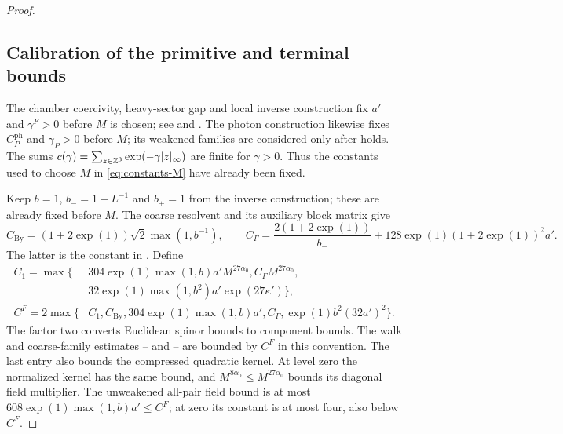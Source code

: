 \begin{proof}
\subsection{Calibration of the primitive and terminal bounds}

The chamber coercivity, heavy-sector gap and local inverse
construction fix $a'$ and $\gamma^F>0$ before $M$ is chosen;
see  and
. The photon construction
likewise fixes $C_P^{\mathrm{ph}}$ and $\gamma_P>0$ before $M$;
its weakened families are considered only after
 holds.
The sums $c(\gamma)=\sum_{z\in\mathbb Z^3}
\exp(-\gamma|z|_\infty)$ are finite for $\gamma>0$.
Thus the constants used to choose $M$ in
\eqref{eq:constants-M} have already been fixed.

Keep $b=1$, $b_-=1-L^{-1}$ and $b_+=1$ from the inverse
construction; these are already fixed before $M$.
The coarse resolvent and its auxiliary block matrix give
\[
 C_{\mathrm{By}}=(1+2\exp(1))\sqrt2\max(1,b_-^{-1}),
 \qquad
 C_\Gamma=\frac{2(1+2\exp(1))}{b_-}
                  +128\exp(1)(1+2\exp(1))^2a'.
\]
The latter is the constant in
. Define
\begin{equation}\label{eq:constants-fermion-calibration}
 \begin{split}
 C_1=\max\{&
 304\exp(1)\max(1,b)a'M^{27\alpha_0},
 C_\Gamma M^{27\alpha_0},\\
 &32\exp(1)\max(1,b^2)a'\exp(27\kappa')\},\\
 C^F=2\max\{&
 C_1,C_{\mathrm{By}},304\exp(1)\max(1,b)a',
 C_\Gamma,\exp(1)b^2(32a')^2\}.
 \end{split}
\end{equation}
The factor two converts Euclidean spinor bounds to
component bounds. The walk and coarse-family estimates
--
and --
are bounded by $C^F$ in this convention. The last entry
also bounds the compressed quadratic kernel.
At level zero the normalized kernel has the same bound,
and $M^{8\alpha_0}\le M^{27\alpha_0}$ bounds its diagonal
field multiplier.
The unweakened all-pair field bound
 is at most
$608\exp(1)\max(1,b)a'\le C^F$; at zero its constant is
at most four, also below $C^F$.


\end{proof}
